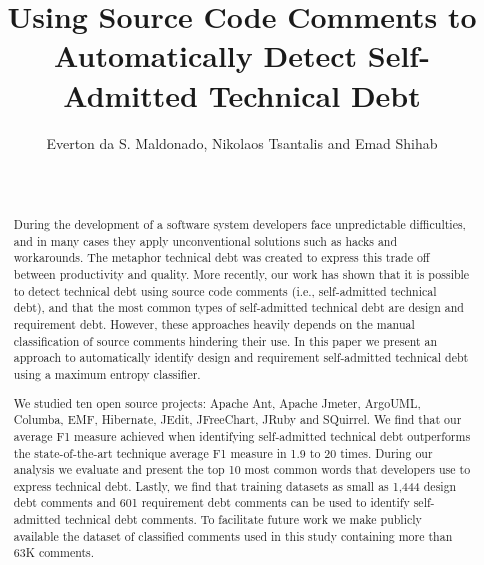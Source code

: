 \documentclass{sig-alternate}
\newcommand{\SATD}{self-admitted technical debt\xspace}
\begin{document}

\title{Using Source Code Comments to Automatically Detect Self-Admitted Technical Debt}

\author{
\alignauthor 
       Everton da S. Maldonado, Nikolaos Tsantalis and Emad Shihab\\
       \\
       \\
}

\maketitle
\begin{abstract}
During the development of a software system developers face unpredictable difficulties, and in many cases they apply unconventional solutions such as hacks and workarounds. The metaphor technical debt was created to express this trade off between productivity and quality. More recently, our work has shown that it is possible to detect technical debt using source code comments (i.e., self-admitted technical debt), and that the most common types of self-admitted technical debt are design and requirement debt. However, these approaches heavily depends on the manual classification of source comments hindering their use. In this paper we present an approach to automatically identify design and requirement \SATD using a maximum entropy classifier. 

We studied ten open source projects: Apache Ant, Apache Jmeter, ArgoUML, Columba, EMF, Hibernate, JEdit, JFreeChart, JRuby and SQuirrel. We find that our average F1 measure achieved when identifying \SATD outperforms the state-of-the-art technique average F1 measure in 1.9 to 20 times. During our analysis we evaluate and present the top 10 most common words that developers use to express technical debt. Lastly, we find that training datasets as small as 1,444 design debt comments and 601 requirement debt comments can be used to identify \SATD comments. To facilitate future work we make publicly available the dataset of classified comments used in this study containing more than 63K comments. 

\end{abstract}
\end{document}
